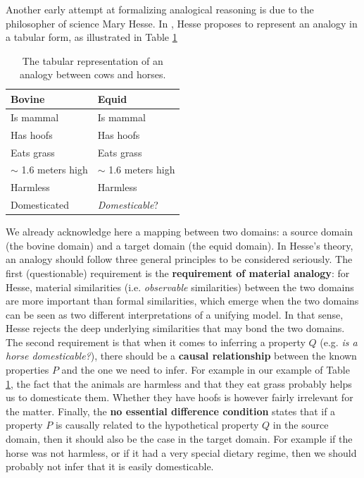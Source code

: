 Another early attempt at formalizing analogical reasoning is due to the
philosopher of science Mary Hesse. In \cite{Hes66}, Hesse proposes to represent
an analogy in a tabular form, as illustrated in Table \ref{TAB:Hesse_analogy}
\begin{table}[t]
  \centering
  \begin{tabular}{ll}
    \toprule
    Bovine & Equid\\
    \midrule
    Is mammal & Is mammal\\
    Has hoofs & Has hoofs\\
    Eats grass & Eats grass\\
    $\sim$ 1.6 meters high & $\sim$ 1.6 meters high\\
    Harmless & Harmless\\
    Domesticated & \textit{Domesticable}?\\
    \bottomrule
  \end{tabular}
  \caption{The tabular representation of an analogy between cows and horses.}
  \label{TAB:Hesse_analogy}
\end{table}
We already acknowledge here a mapping between two domains: a source domain (the
bovine domain) and a target domain (the equid domain). In Hesse's theory, an
analogy should follow three general principles to be considered seriously. The
first (questionable) requirement is the \textbf{requirement of material
analogy}: for Hesse, material similarities (i.e. \textit{observable}
similarities) between the two domains are more important than formal
similarities, which emerge when the two domains can be seen as two different
interpretations of a unifying model. In that sense, Hesse rejects the deep
underlying similarities that may bond the two domains. The second requirement
is that when it comes to inferring a property $Q$ (e.g. \textit{is a horse
domesticable?}), there should be a \textbf{causal relationship} between the
known properties $P$ and the one we need to infer. For example in our example
of Table \ref{TAB:Hesse_analogy}, the fact that the animals are harmless
and that they eat grass probably helps us to domesticate them. Whether they
have hoofs is however fairly irrelevant for the matter. Finally, the \textbf{no
essential difference condition} states that if a property $P$ is causally
related to the hypothetical property $Q$ in the source domain, then it should
also be the case in the target domain. For example if the horse was not
harmless, or if it had a very special dietary regime, then we should probably
not infer that it is easily domesticable.

